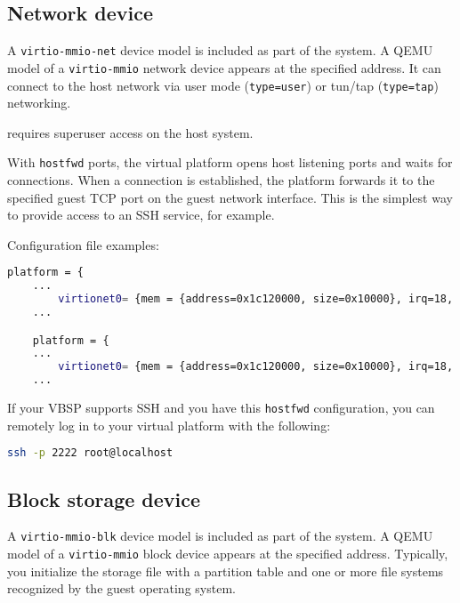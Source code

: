 \subsection{Network device}

A {\small{\lstinline!virtio-mmio-net!}} device model is included as part of the system. A QEMU model of a {\small{\lstinline!virtio-mmio!}} network device appears at the specified address. It can connect to the host network via user mode ({\small{\lstinline!type=user!}}) or tun/tap ({\small{\lstinline!type=tap!}}) networking.

 requires superuser access on the host system.

With {\small{\lstinline!hostfwd!}} ports, the virtual platform opens host listening ports and waits for connections. When a connection is established, the platform forwards it to the specified guest TCP port on the guest network interface. This is the simplest way to provide access to an SSH service, for example.

Configuration file examples:

\small
\begin{lstlisting}[language=bash]
    platform = {
    ...
        virtionet0= {mem = {address=0x1c120000, size=0x10000}, irq=18, netdev_str="type=user,hostfwd=tcp::2222-:22,hostfwd=tcp::2221-:21"};
    ...

    platform = {
    ...
        virtionet0= {mem = {address=0x1c120000, size=0x10000}, irq=18, netdev_str="type=tap"};
    ...
\end{lstlisting}
\normalsize


If your VBSP supports SSH and you have this {\small{\lstinline!hostfwd!}} configuration, you can remotely log in to your virtual platform with the following:

\small
\begin{lstlisting}[language=bash]
    ssh -p 2222 root@localhost
\end{lstlisting}
\normalsize


\subsection{Block storage device}

A {\small{\lstinline!virtio-mmio-blk!}} device model is included as part of the system. A QEMU model of a {\small{\lstinline!virtio-mmio!}} block device appears at the specified address. Typically, you initialize the storage file with a partition table and one or more file systems recognized by the guest operating system.

